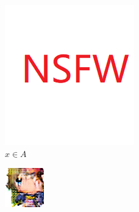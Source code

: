 \documentclass[twocolumn,11pt]{ctexart}
\begin{document}
\begin{figure}[htb]
    \centering
    \begin{subfigure}[b]{0.24\linewidth}
        \includegraphics[width=\linewidth]{NSFW.png}
        \caption{$x \in A$}
      \end{subfigure}
      \begin{subfigure}[b]{0.24\linewidth}
        \includegraphics[width=\linewidth]{exp1_fake_B.png}

\end{subfigure}
\end{figure}
\end{document}
